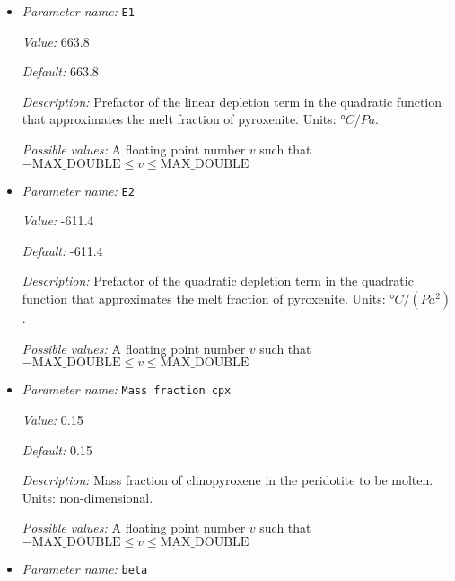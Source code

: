 \begin{itemize}
{\it Value:} -5.1e-18


{\it Default:} -5.1e-18


{\it Description:} Prefactor of the quadratic pressure term in the quadratic function that approximates the solidus of pyroxenite. Units: $°C/(Pa^2)$.


{\it Possible values:} A floating point number $v$ such that $-\text{MAX\_DOUBLE} \leq v \leq \text{MAX\_DOUBLE}$
\item {\it Parameter name:} {\tt E1}
\label{parameters:Postprocess/Visualization/Melt fraction/E1}


{\it Value:} 663.8


{\it Default:} 663.8


{\it Description:} Prefactor of the linear depletion term in the quadratic function that approximates the melt fraction of pyroxenite. Units: $°C/Pa$.


{\it Possible values:} A floating point number $v$ such that $-\text{MAX\_DOUBLE} \leq v \leq \text{MAX\_DOUBLE}$
\item {\it Parameter name:} {\tt E2}
\label{parameters:Postprocess/Visualization/Melt fraction/E2}


{\it Value:} -611.4


{\it Default:} -611.4


{\it Description:} Prefactor of the quadratic depletion term in the quadratic function that approximates the melt fraction of pyroxenite. Units: $°C/(Pa^2)$.


{\it Possible values:} A floating point number $v$ such that $-\text{MAX\_DOUBLE} \leq v \leq \text{MAX\_DOUBLE}$
\item {\it Parameter name:} {\tt Mass fraction cpx}
\label{parameters:Postprocess/Visualization/Melt fraction/Mass fraction cpx}


{\it Value:} 0.15


{\it Default:} 0.15


{\it Description:} Mass fraction of clinopyroxene in the peridotite to be molten. Units: non-dimensional.


{\it Possible values:} A floating point number $v$ such that $-\text{MAX\_DOUBLE} \leq v \leq \text{MAX\_DOUBLE}$
\item {\it Parameter name:} {\tt beta}
\label{parameters:Postprocess/Visualization/Melt fraction/beta}



\end{itemize}
